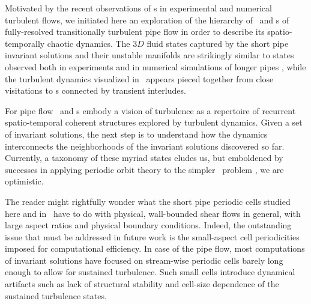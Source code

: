 \documentclass{jfm}
\begin{document}
Motivated by the recent observations of \recurrStr s in experimental and
numerical turbulent flows, we initiated here an exploration of the
hierarchy of \reqva\ and \rpo s of fully-resolved transitionally
turbulent pipe flow in order to describe its spatio-temporally chaotic
dynamics. The $3D$ fluid states captured by the short pipe invariant
solutions and their unstable manifolds are strikingly similar to states
observed both in experiments and in numerical simulations of longer pipes
\citep{science04}, while the turbulent dynamics visualized in \statesp\
appears pieced together from close visitations to \cohStr s connected by
transient interludes.

For pipe flow \reqva\ and \rpo s embody a vision of turbulence as a
repertoire of recurrent spatio-temporal coherent structures explored by
turbulent dynamics. Given a set of invariant solutions, the next
step is to understand how the dynamics interconnects the neighborhoods of
the invariant solutions discovered so far.
Currently, a taxonomy of these myriad states eludes us, but emboldened by
successes in applying periodic orbit theory to the simpler \KS\ problem
\citep{Christiansen97,lanCvit07,SCD07}, we are optimistic.

The reader might rightfully wonder what the short pipe periodic cells
studied here and in \pCf\ have to do with physical,
wall-bounded shear flows in general, with large aspect ratios and
physical boundary conditions. Indeed, the outstanding issue
that must be addressed in future work is the small-aspect cell
periodicities imposed for computational efficiency. In case of the pipe
flow, most computations of invariant solutions have focused on
stream-wise periodic cells barely long enough to allow for sustained
turbulence. Such small cells introduce dynamical artifacts such as lack
of structural stability and cell-size dependence of the sustained
turbulence states.
\end{document}

